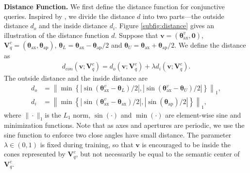 \documentclass{article}
\newcommand{\gb}[1]{\boldsymbol{#1}}
\newcommand{\taxis}{\text{ax}}
\newcommand{\targ}{\text{ap}}
\newcommand{\ee}{\mathbf{v}}
\newcommand{\qe}{\mathbf{V}_q}
\begin{document}
\textbf{Distance Function.} We first define the distance function for conjunctive queries. Inspired by \citet{q2b}, we divide the distance $d$ into two parts---the outside distance $d_o$ and the inside distance $d_i$. Figure \ref{subfig:distance} gives an illustration of the distance function $d$. Suppose that $\textbf{v}=(\gb{\theta}^v_{\taxis},\textbf{0})$, $\textbf{V}_q^c=(\gb{\theta}_{\taxis},\gb{\theta}_{\targ})$, $\gb{\theta}_L=\gb{\theta}_{\taxis}-\gb{\theta}_{\targ}/2$ and $\gb{\theta}_U=\gb{\theta}_{\taxis}+\gb{\theta}_{\targ}/2$. We define the distance as
\begin{align*}
    d_{con}(\ee;\qe^c)=d_o(\ee;\qe^c)+\lambda d_i(\ee;\qe^c).
\end{align*}
The outside distance and the inside distance are 
\begin{align*}
    d_o&=\left\|\min\left\{\left|\sin\left(\gb{\theta}^v_{\taxis}-\gb{\theta}_L\right)/2\right|,\left|\sin\left(\gb{\theta}^v_{\taxis}-\gb{\theta}_U\right)/2\right|\right\}\right\|_1,\\
    d_i&=\left\|\min\left\{\left|\sin\left(\gb{\theta}^v_{\taxis}-\gb{\theta}_{\taxis}\right)/2\right|,\left|\sin\left(\gb{\theta}_{\targ}\right)/2\right| \right\}\right\|_1,
\end{align*}
where $\|\cdot\|_1$is the $L_1$ norm, $\sin(\cdot)$ and $\min(\cdot)$ are element-wise sine and minimization functions. Note that as axes and apertures are periodic, we use the sine function to enforce two close angles have small distance. The parameter $\lambda\in (0,1)$ is fixed during training, so that $\textbf{v}$ is encouraged to be inside the cones represented by $\textbf{V}_q^c$,
but not necessarily be equal to the semantic center of $\textbf{V}_q^c$.
\end{document}
